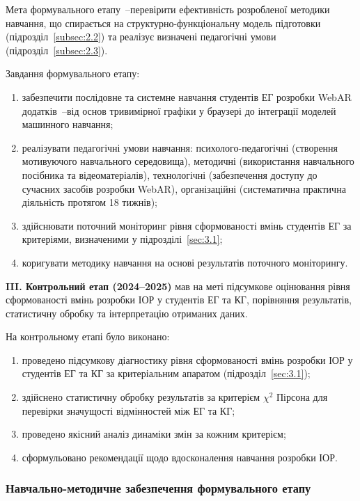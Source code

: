 Мета формувального етапу~--перевірити ефективність розробленої методики навчання, що спирається на структурно-функціональну модель підготовки (підрозділ~\ref{subsec:2.2}) та реалізує визначені педагогічні умови (підрозділ~\ref{subsec:2.3}).

Завдання формувального етапу:
\begin{enumerate}
\item забезпечити послідовне та системне навчання студентів ЕГ розробки WebAR додатків~--від основ тривимірної графіки у браузері до інтеграції моделей машинного навчання;
\item реалізувати педагогічні умови навчання: психолого-педагогічні (створення мотивуючого навчального середовища), методичні (використання навчального посібника та відеоматеріалів), технологічні (забезпечення доступу до сучасних засобів розробки WebAR), організаційні (систематична практична діяльність протягом 18 тижнів);
\item здійснювати поточний моніторинг рівня сформованості вмінь студентів ЕГ за критеріями, визначеними у підрозділі~\ref{sec:3.1};
\item коригувати методику навчання на основі результатів поточного моніторингу.
\end{enumerate}

\textbf{III. Контрольний етап (2024--2025)} мав на меті підсумкове оцінювання рівня сформованості вмінь розробки ІОР у студентів ЕГ та КГ, порівняння результатів, статистичну обробку та інтерпретацію отриманих даних.

На контрольному етапі було виконано:
\begin{enumerate}
\item проведено підсумкову діагностику рівня сформованості вмінь розробки ІОР у студентів ЕГ та КГ за критеріальним апаратом (підрозділ~\ref{sec:3.1});
\item здійснено статистичну обробку результатів за критерієм $\chi^2$ Пірсона для перевірки значущості відмінностей між ЕГ та КГ;
\item проведено якісний аналіз динаміки змін за кожним критерієм;
\item сформульовано рекомендації щодо вдосконалення навчання розробки ІОР.
\end{enumerate}

\subsubsection{Навчально-методичне забезпечення формувального етапу}

